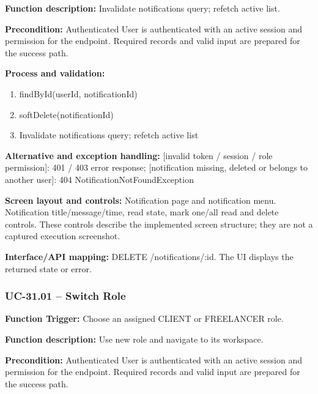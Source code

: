 \textbf{Function description:} Invalidate notifications query; refetch active list.

\textbf{Precondition:} Authenticated User is authenticated with an active session and permission for the endpoint. Required records and valid input are prepared for the success path.

\textbf{Process and validation:}
\begin{enumerate}
\item find\allowbreak{}By\allowbreak{}Id(user\allowbreak{}Id, notification\allowbreak{}Id)
\item soft\allowbreak{}Delete(notification\allowbreak{}Id)
\item Invalidate notifications query; refetch active list
\end{enumerate}
\textbf{Alternative and exception handling:} [invalid token /\allowbreak{} session /\allowbreak{} role permission]: 401 /\allowbreak{} 403 error response; [notification missing, deleted or belongs to another user]: 404 Notification\allowbreak{}Not\allowbreak{}Found\allowbreak{}Exception

\textbf{Screen layout and controls:} Notification page and notification menu. Notification title/\allowbreak{}message/\allowbreak{}time, read state, mark one/\allowbreak{}all read and delete controls. These controls describe the implemented screen structure; they are not a captured execution screenshot.

\textbf{Interface/\allowbreak{}API mapping:} DELETE /\allowbreak{}notifications/\allowbreak{}:id. The UI displays the returned state or error.

\subsubsection{UC-31.01 -- Switch Role}
\textbf{Function Trigger:} Choose an assigned CLIENT or FREELANCER role.

\textbf{Function description:} Use new role and navigate to its workspace.

\textbf{Precondition:} Authenticated User is authenticated with an active session and permission for the endpoint. Required records and valid input are prepared for the success path.

